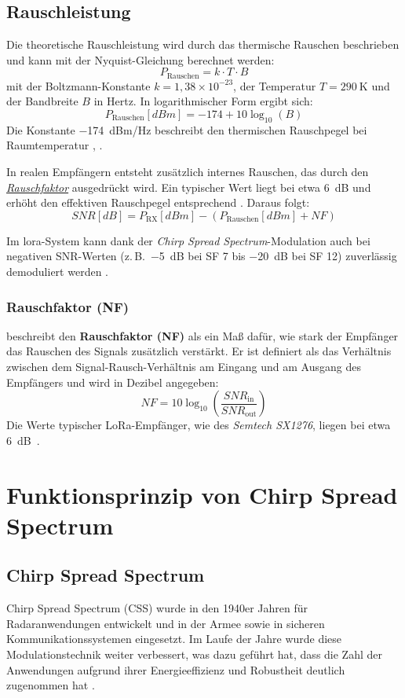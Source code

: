 \subsection{Rauschleistung}
	Die theoretische Rauschleistung wird durch das thermische Rauschen beschrieben und kann mit der Nyquist-Gleichung berechnet werden:
	\[
	P_\text{Rauschen} = k \cdot T \cdot B
	\]
	mit der Boltzmann-Konstante \(k = 1{,}38\times10^{-23}\), der Temperatur \(T = 290~\text{K}\) und der Bandbreite \(B\) in Hertz. 
	In logarithmischer Form ergibt sich:
	\[
	P_\text{Rauschen}[dBm] = -174 + 10\log_{10}(B)
	\]
	Die Konstante −174~dBm/Hz beschreibt den thermischen Rauschpegel bei Raumtemperatur \cite{Semtech:2015}, \cite{Singh:2017}.
	
	In realen Empfängern entsteht zusätzlich internes Rauschen, das durch den \hyperref[lora:noiseFigure]{\textit{Rauschfaktor}}  ausgedrückt wird. 
	Ein typischer Wert liegt bei etwa 6~dB und erhöht den effektiven Rauschpegel entsprechend \cite{Semtech:2015}. 
	Daraus folgt:
	\[
	SNR[dB] = P_\text{RX}[dBm] - (P_\text{Rauschen}[dBm] + NF)
	\]
	
	\medskip
	Im \ac{lora}-System kann dank der \textit{Chirp Spread Spectrum}-Modulation auch bei negativen SNR-Werten 
(z.\,B.\ −5~dB bei SF 7 bis −20~dB bei SF 12) zuverlässig demoduliert werden \cite{Semtech:2015b}. 

\subsubsection{Rauschfaktor (NF) \label{lora:noiseFigure}}
	\citeauthor{Negreiros:2005} beschreibt den \textbf{Rauschfaktor (NF)} als ein Ma{\ss} dafür, 
	wie stark der Empfänger das Rauschen des Signals zusätzlich verstärkt. 
	Er ist definiert als das Verhältnis zwischen dem Signal-Rausch-Verhältnis am Eingang und am Ausgang des Empfängers 
	und wird in Dezibel angegeben:
	\[
	NF = 10 \log_{10}\!\left(\frac{SNR_\text{in}}{SNR_\text{out}}\right)
	\]
	Die Werte typischer LoRa-Empfänger, wie des \textit{Semtech SX1276}, liegen bei etwa 6~dB~\cite{Semtech:2015}.
	


\section{Funktionsprinzip von Chirp Spread Spectrum\label{lora:modulation}}
	\subsection{Chirp Spread Spectrum}
	Chirp Spread Spectrum (CSS) wurde in den 1940er Jahren für Radaranwendungen entwickelt und in der Armee sowie in sicheren Kommunikationssystemen eingesetzt. Im Laufe der Jahre wurde diese Modulationstechnik weiter verbessert, was dazu geführt hat, dass die Zahl der Anwendungen aufgrund ihrer Energieeffizienz und Robustheit deutlich zugenommen hat \cite{Semtech:2015}.

